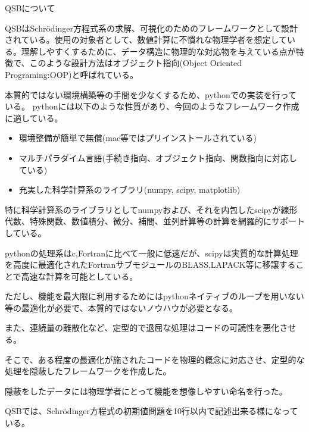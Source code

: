 \documentclass[a4paper, lualatex]{bxjsarticle}
\begin{document}
    \begin{subsection}{QSBについて}
        \par QSBはSchrödinger方程式系の求解、可視化のためのフレームワークとして設計されている。使用の対象者として、数値計算に不慣れな物理学者を想定している。理解しやすくするために、データ構造に物理的な対応物を与えている点が特徴で、このような設計方法はオブジェクト指向(Object Oriented Programing:OOP)と呼ばれている。
        \par 本質的ではない環境構築等の手間を少なくするため、pythonでの実装を行っている。
        pythonには以下のような性質があり、今回のようなフレームワーク作成に適している。
        \begin{itemize}
            \item 環境整備が簡単で無償(mac等ではプリインストールされている)
            \item マルチパラダイム言語(手続き指向、オブジェクト指向、関数指向に対応している)
            \item 充実した科学計算系のライブラリ(numpy, scipy, matplotlib)
        \end{itemize}
        \par 特に科学計算系のライブラリとしてnumpyおよび、それを内包したscipyが線形代数、特殊関数、数値積分、微分、補間、並列計算等の計算を網羅的にサポートしている。
        \par pythonの処理系はc,Fortranに比べて一般に低速だが、scipyは実質的な計算処理を高度に最適化されたFortranサブモジュールのBLASS,LAPACK等に移譲することで高速な計算を可能としている。
        \par ただし、機能を最大限に利用するためにはpythonネイティブのループを用いない等の最適化が必要で、本質的ではないノウハウが必要となる。
        \par また、連続量の離散化など、定型的で退屈な処理はコードの可読性を悪化させる。
        \par そこで、ある程度の最適化が施されたコードを物理的概念に対応させ、定型的な処理を隠蔽したフレームワークを作成した。
        \par 隠蔽をしたデータには物理学者にとって機能を想像しやすい命名を行った。
        \par QSBでは、Schrödinger方程式の初期値問題を10行以内で記述出来る様になっている。
    \end{subsection}
\end{document}
